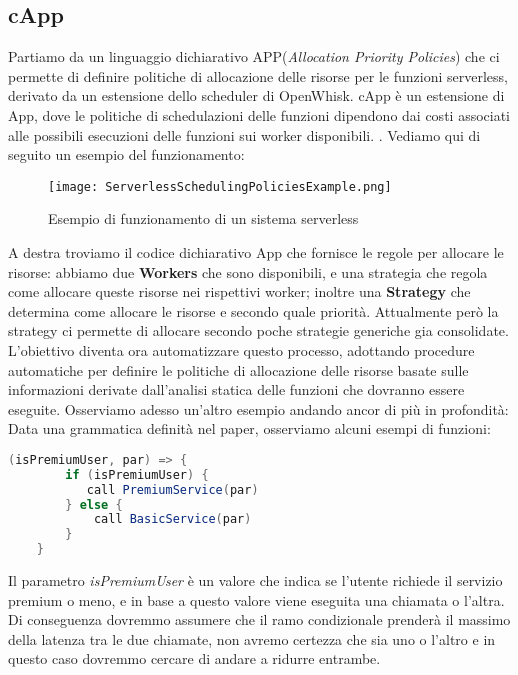 \documentclass[../main.tex]{subfiles}
\begin{document}
\subsection{cApp}
Partiamo da un linguaggio dichiarativo APP(\textit{Allocation Priority Policies}) che ci permette di definire politiche di allocazione delle risorse per le funzioni serverless, derivato da un estensione dello scheduler di OpenWhisk.
cApp è un estensione di App, dove le politiche di schedulazioni delle funzioni dipendono dai costi associati alle possibili esecuzioni delle funzioni sui worker disponibili.
\autocite{de2020allocation}.
Vediamo qui di seguito un esempio del funzionamento:
\begin{figure}[H]
   \centering
    \texttt{[image: ServerlessSchedulingPoliciesExample.png]}
    \caption{Esempio di funzionamento di un sistema serverless \autocite{deserverless}}
\end{figure}
A destra troviamo il codice dichiarativo App che fornisce le regole per allocare le risorse: abbiamo due \textbf{Workers} che sono disponibili, e una strategia che regola come allocare queste risorse nei rispettivi worker; inoltre una \textbf{Strategy} che determina come allocare le risorse e secondo quale priorità.
Attualmente però la strategy ci permette di allocare secondo poche strategie generiche gia consolidate.
L'obiettivo diventa ora automatizzare questo processo, adottando procedure automatiche per definire le politiche di allocazione delle risorse basate sulle informazioni derivate dall'analisi statica delle funzioni che dovranno essere eseguite.
Osserviamo adesso un'altro esempio andando ancor di più in profondità:
Data una grammatica definità nel paper\autocite {deserverless}, osserviamo alcuni esempi di funzioni:
\begin{lstlisting}[language=Java, caption= La guardia della condizione è un espressione,label={lst:1}]
    (isPremiumUser, par) => {
        if (isPremiumUser) {
           call PremiumService(par)
        } else {
            call BasicService(par)
        }
    }
\end{lstlisting}

Il parametro \textit{isPremiumUser} è un valore che indica se l'utente richiede il servizio premium o meno, e in base a questo valore viene eseguita una chiamata o l'altra.
Di conseguenza dovremmo assumere che il ramo condizionale prenderà il massimo della latenza tra le due chiamate, non avremo certezza che sia uno o l'altro e in questo caso dovremmo cercare di andare a ridurre entrambe.
\end{document}
